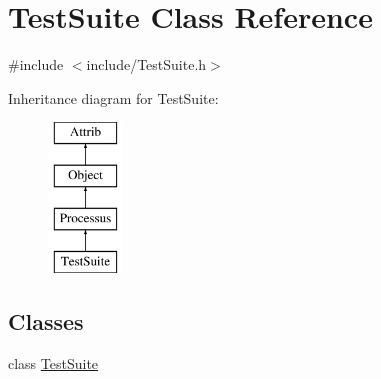\hypertarget{classTestSuite}{}\section{Test\+Suite Class Reference}
\label{classTestSuite}


{\ttfamily \#include $<$include/\+Test\+Suite.\+h$>$}

Inheritance diagram for Test\+Suite\+:\begin{figure}[H]
\begin{center}
\leavevmode
\includegraphics[height=4.000000cm]{classTestSuite}
\end{center}
\end{figure}
\subsection*{Classes}
\begin{DoxyCompactItemize}
\item 
class \hyperlink{classTestSuite_1_1TestSuite}{Test\+Suite}
\end{DoxyCompactItemize}
